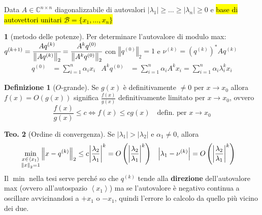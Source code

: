 \documentclass[a4paper,10pt]{article}
\theoremstyle{definition}
\theoremstyle{indentdefinition}
\newtheorem{defn}{Definizione}[section]
\theoremstyle{indenttheorem}
\newtheorem{thm}{Teo.}
\theoremstyle{myremark}
\theoremstyle{indentgeneral}
\newtheorem{lyxalgorithm}[thm]{\protect\algorithmname}
\theoremstyle{plain}
\theoremstyle{plain}
\newenvironment{myboxed} 
{\noindent\begin{lrbox}{\mybox}\begin{minipage}{\textwidth}}
{\end{minipage}\end{lrbox}\fbox{\usebox{\mybox}}}
\begin{document}
Data $A\in\mathbb{C}^{n\times n}$ diagonalizzabile di autovalori
$\left|\lambda_{1}\right|\geq\ldots\geq\left|\lambda_{n}\right|\geq0$
e \hl{base di autovettori unitari $\mathscr{B}=\{x_{1},\ldots,x_{n}\}$}
\begin{lyxalgorithm}[metodo delle potenze] Per determinare l'autovalore di modulo max:
\label{def:metodo-delle-potenze}$q^{\left(k+1\right)}=\cfrac{Aq^{\left(k\right)}}{\left\Vert Aq^{\left(k\right)}\right\Vert _{2}}=\cfrac{A^{k}q^{\left(0\right)}}{\left\Vert A^{k}q^{\left(0\right)}\right\Vert _{2}}$
con $\left\Vert q^{\left(0\right)}\right\Vert _{2}=1$ e $\nu^{\left(k\right)}=\left(q^{\left(k\right)}\right)^{*}Aq^{\left(k\right)}$
\begin{align*}
q^{\left(0\right)} & =\sum_{i=1}^{n}\alpha_{i}x_{i} & A^{k}q^{\left(0\right)} & =\sum_{i=1}^{n}\alpha_{i}A^{k}x_{i}=\sum_{i=1}^{n}\alpha_{i}\lambda_{i}^{k}x_{i}
\end{align*}
\end{lyxalgorithm}

\begin{defn}[$O$-grande] Se $g(x)$ è definitivamente $\ne 0$ per $x\to x_0$ allora $f(x)=O(g(x))$ significa $\frac{f(x)}{g(x)}$ definitivamente limitato per $x\to x_0$, ovvero
$$\frac{f(x)}{g(x)}\le c\iff f(x)\le cg(x)\quad\text{defin. per $x\to x_0$}$$
    
\end{defn}

\begin{myboxed}
\begin{thm}[Ordine di convergenza] \label{thm:ordine-di-convergenza}
Se $\left|\lambda_{1}\right|>\left|\lambda_{2}\right|$\textup{ e
$\alpha_{1}\neq0$, allora 
\begin{align*}
\min_{\substack{x\in\left\langle x_{1}\right\rangle \\
\left\Vert x\right\Vert _{2}=1
}
}\left\Vert x-q^{\left(k\right)}\right\Vert _{2} & \le c\abs{\frac{\lambda_{2}}{\lambda_{1}}}^k=O\left(\left|\frac{\lambda_{2}}{\lambda_{1}}\right|^{k}\right) & \left|\lambda_{1}-\nu^{\left(k\right)}\right| & =O\left(\left|\frac{\lambda_{2}}{\lambda_{1}}\right|^{k}\right)
\end{align*}
}
Il $\min$ nella tesi serve perché so che $q^{(k)}$ tende alla \textbf{direzione} dell'autovalore max (ovvero all'autospazio $\left\langle x_{1}\right\rangle$) ma se l'autovalore è negativo continua a oscillare avvicinandosi a $+ x_{1}$ o $- x_{1}$, quindi l'errore lo calcolo da quello più vicino dei due.
\end{thm}
\end{myboxed}
\end{document}
